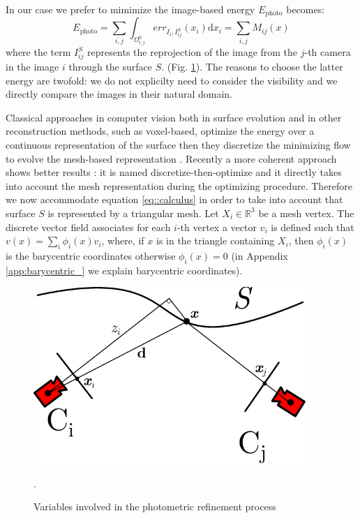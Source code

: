 In our case we prefer to mimimize  \cite{pons2007multi} the image-based  energy $E_{\textrm{photo}}$ becomes:
\begin{equation}
\label{eq:energy_photo}
  E_{\textrm{photo}} = \sum_{i,j}\int_{\Omega^{\textrm{S}}_{i,j}} err_{I_i, I_{ij}^{\mathit{S}}}(x_i)\textrm{d}x_i = \sum_{i,j} \mathit{M}_{ij}(x)
\end{equation}
where the term $I_{ij}^{\mathit{S}}$ represents the reprojection of the image from the $j$-th camera in the image $i$ through the surface $\mathit{S}$.
(Fig. \ref{fig:cameraproj}).
The reasons to choose the latter energy are twofold: we do not explicilty need to consider the visibility and we directly compare the images in their natural domain.

Classical approaches in computer vision both in surface evolution and in other reconstruction methods, such as voxel-based, optimize the energy over a continuous representation of the surface then they discretize the minimizing flow to evolve the mesh-based representation \cite{pons2007multi,faugeras2002variational}. Recently a more coherent approach shows better results \cite{vu_et_al_2012,delaunoy_et_al_08}: it is named discretize-then-optimize and it directly takes into account the mesh representation during the optimizing procedure. 
Therefore we now accommodate equation \eqref{eq::calculus} in order to take into account that  surface $\mathit{S}$ is represented by a triangular mesh. 
Let $X_i \in \mathbb{R}^3$ be a mesh vertex. The discrete vector field associates for each $i$-th vertex a vector $v_i$ is defined such that $v(x) = \sum_i \phi_i(x) v_i$, where, if $x$ is in the triangle containing $X_i$, then $\phi_i(x)$ is the barycentric coordinates otherwise $\phi_i(x) = 0$ (in Appendix \ref{app:barycentric_} we explain barycentric coordinates).


\begin{figure}[t]
\centering
\includegraphics[width=0.92\textwidth]{./img/ch-incr-dens/cameproj}
\caption{Variables involved in the photometric refinement process}.
\label{fig:cameraproj}
\end{figure}

